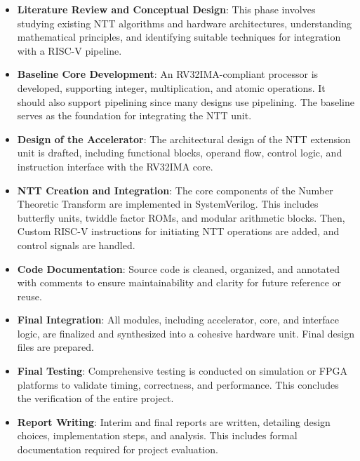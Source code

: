 \documentclass[a4paper, 12pt, titlepage]{article}
\begin{document}
\begin{itemize}
    \item \textbf{Literature Review and Conceptual Design}: This phase involves studying existing NTT algorithms and hardware architectures, understanding mathematical principles, and identifying suitable techniques for integration with a RISC-V pipeline.

    \item \textbf{Baseline Core Development}: An RV32IMA-compliant processor is developed, supporting integer, multiplication, and atomic operations. It should also support pipelining since many designs use pipelining. The baseline serves as the foundation for integrating the NTT unit.

    \item \textbf{Design of the Accelerator}: The architectural design of the NTT extension unit is drafted, including functional blocks, operand flow, control logic, and instruction interface with the RV32IMA core.

    \item \textbf{NTT Creation and Integration}: The core components of the Number Theoretic Transform are implemented in SystemVerilog. This includes butterfly units, twiddle factor ROMs, and modular arithmetic blocks. Then, Custom RISC-V instructions for initiating NTT operations are added, and control signals are handled.

    \item \textbf{Code Documentation}: Source code is cleaned, organized, and annotated with comments to ensure maintainability and clarity for future reference or reuse.

    \item \textbf{Final Integration}: All modules, including accelerator, core, and interface logic, are finalized and synthesized into a cohesive hardware unit. Final design files are prepared.

    \item \textbf{Final Testing}: Comprehensive testing is conducted on simulation or FPGA platforms to validate timing, correctness, and performance. This concludes the verification of the entire project.
    
    \item \textbf{Report Writing}: Interim and final reports are written, detailing design choices, implementation steps, and analysis. This includes formal documentation required for project evaluation.
\end{itemize}
\end{document}
